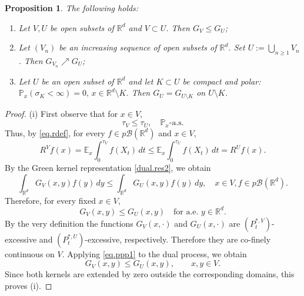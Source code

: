 \documentclass[11pt,a4paper,reqno]{amsart}
\newtheorem{proposition}[theorem]{\bf Proposition}
\theoremstyle{definition}
\numberwithin{equation}{section}
\begin{document}
\begin{proposition}
\label{prop.green}
The following holds:
\begin{enumerate}
\item Let $V,U$ be open subsets of $\mathbb R^d$ and $V\subset U$. Then $G_V\le G_U$;
\item Let $(V_n)$ be an increasing  sequence of open subsets of $\mathbb R^d$. Set $U:=\bigcup_{n\ge 1}V_n$.
Then $G_{V_n}\nearrow G_U$;
\item Let $U$ be an open subset of $\mathbb R^d$ and  let $K\subset U$ be  compact and polar:
$\mathbb P_x(\sigma_K<\infty)=0,\, x\in \mathbb R^d\setminus K$.
 Then $G_{U}=G_{U\setminus K}$ on $U\setminus K$.
\end{enumerate}
\end{proposition}
\begin{proof}
(i) First observe that for $x\in V$,
\[
\tau_V\leq \tau_U,\quad \mathbb P_x\text{-a.s.}
\]
Thus, by \eqref{eq.rdef}, for every $f\in p\mathscr B(\mathbb R^d)$  and $x\in V$,
\[
R^V f(x)
=
\mathbb E_x\int_0^{\tau_V} f(X_t)\,dt
\leq
\mathbb E_x\int_0^{\tau_U} f(X_t)\,dt
=
R^U f(x).
\]
By the Green kernel representation \eqref{dual.res2}, we obtain
\[
\int_{\mathbb R^d} G_V(x,y)f(y)\,dy
\leq
\int_{\mathbb R^d} G_U(x,y)f(y)\,dy,
\quad x\in V, f\in p\mathscr B(\mathbb R^d).
\]
Therefore, for every fixed $x\in V$,
\[
G_V(x,y)\leq G_U(x,y)
\quad \text{for a.e. } y\in \mathbb R^d.
\]
By the very definition  the functions $G_V(x,\cdot)$ and
$G_U(x,\cdot)$ are $(P^{*,V}_t)$-excessive and $(P^{*,U}_t)$-excessive, respectively.  
Therefore they are co-finely continuous on $V$. 
Applying \eqref{eq.ppp1} to the dual process, we obtain
\[
G_V(x,y)\leq G_U(x,y),\qquad x,y\in V.
\]
Since both kernels are extended by zero outside the corresponding domains,
this proves (i). 


\end{proof}
\end{document}
